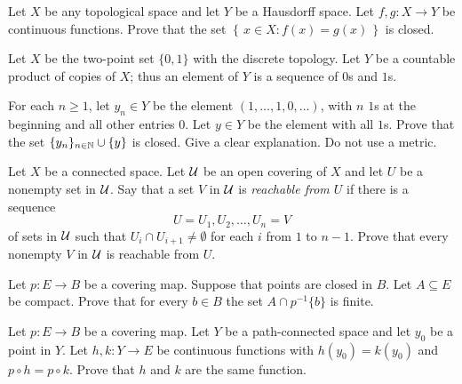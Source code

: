 \begin{problem}
  Let \(X\) be any topological space and let \(Y\) be a Hausdorff
  space. Let \(f,g\colon X\to Y\) be continuous functions. Prove that the
  set \(\left\{\,x\in X:f(x)=g(x)\,\right\}\) is closed.
\end{problem}
\begin{solution}
\end{solution}

\begin{problem}
  Let \(X\) be the two-point set \(\{0,1\}\) with the discrete
  topology. Let \(Y\) be a countable product of copies of \(X\); thus an
  element of \(Y\) is a sequence of \(0\)s and \(1\)s.

  For each \(n\geq 1\), let \(y_n\in Y\) be the element
  \((1,\dotsc,1,0,\dotsc)\), with \(n\) \(1\)s at the beginning and all
  other entries \(0\). Let \(y\in Y\) be the element with all \(1\)s. Prove
  that the set \(\{y_n\}_{n\in\mathbb{N}}\cup\{y\}\) is closed. Give a clear
  explanation. Do not use a metric.
\end{problem}
\begin{solution}
\end{solution}

\begin{problem}
  Let \(X\) be a connected space. Let \(\mathcal{U}\) be an open covering of
  \(X\) and let \(U\) be a nonempty set in \(\mathcal{U}\). Say that a set \(V\)
  in \(\mathcal{U}\) is \emph{reachable from \(U\)} if there is a sequence
  \[
    U=U_1,U_2,\dotsc,U_n=V
  \]
  of sets in \(\mathcal{U}\) such that \(U_i\cap U_{i+1}\neq\emptyset\) for each
  \(i\) from \(1\) to \(n-1\). Prove that every nonempty \(V\) in \(\mathcal{U}\)
  is reachable from \(U\).
\end{problem}
\begin{solution}
\end{solution}

\begin{problem}
  Let \(p\colon E\to B\) be a covering map. Suppose that points are closed
  in \(B\). Let \(A\subseteq E\) be compact. Prove that for every
  \(b\in B\) the set \(A\cap p^{-1}\{b\}\) is finite.
\end{problem}
\begin{solution}
\end{solution}

\begin{problem}
  Let \(p\colon E\to B\) be a covering map. Let \(Y\) be a path-connected
  space and let \(y_0\) be a point in \(Y\). Let \(h,k\colon Y\to E\) be
  continuous functions with \(h(y_0)=k(y_0)\) and \(p\circ h=p\circ
  k\). Prove that \(h\) and \(k\) are the same function.
\end{problem}
\begin{solution}
\end{solution}

